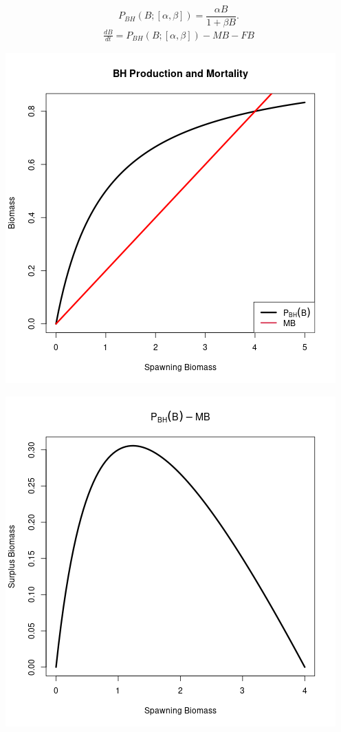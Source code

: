 \documentclass[ xcolor = pdftex, dvipsnames, table ]{beamer}
\begin{document}
%
\begin{frame}
\begin{equation*}
P_{BH}(B;[\alpha, \beta]) = \frac{\alpha B}{1+\beta B}.
\end{equation*}
\begin{align*}
\frac{dB}{dt} = P_{BH}(B;[\alpha, \beta]) -MB -FB %
\end{align*}
\begin{minipage}[h!]{0.49\textwidth}
        \includegraphics[width=\textwidth]{../../gpBias/pBHandM.png}
\end{minipage}
\begin{minipage}[h!]{0.49\textwidth}
        \includegraphics[width=\textwidth]{../../gpBias/yeildBH.png}
\end{minipage}
\end{frame}
\end{document}
